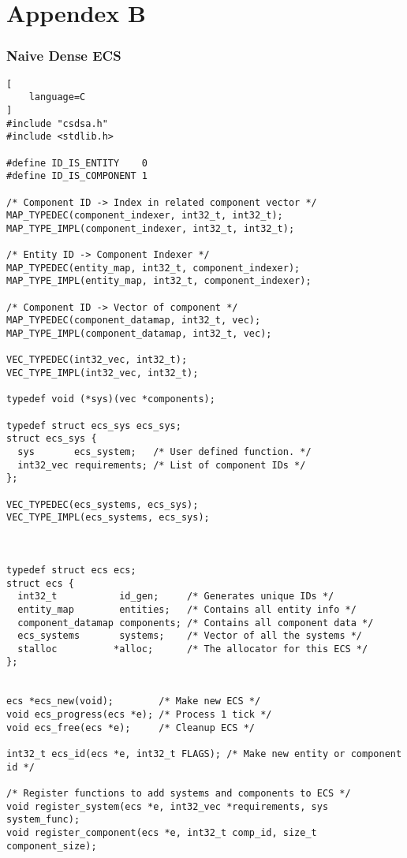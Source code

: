 \section{Appendex B}
\label{appendix:b}

\subsubsection{Naive Dense ECS}
\begin{lstlisting}[
    language=C
]
#include "csdsa.h"
#include <stdlib.h>

#define ID_IS_ENTITY    0
#define ID_IS_COMPONENT 1

/* Component ID -> Index in related component vector */
MAP_TYPEDEC(component_indexer, int32_t, int32_t);
MAP_TYPE_IMPL(component_indexer, int32_t, int32_t);

/* Entity ID -> Component Indexer */
MAP_TYPEDEC(entity_map, int32_t, component_indexer);
MAP_TYPE_IMPL(entity_map, int32_t, component_indexer);

/* Component ID -> Vector of component */
MAP_TYPEDEC(component_datamap, int32_t, vec);
MAP_TYPE_IMPL(component_datamap, int32_t, vec);

VEC_TYPEDEC(int32_vec, int32_t);
VEC_TYPE_IMPL(int32_vec, int32_t);

typedef void (*sys)(vec *components);

typedef struct ecs_sys ecs_sys;
struct ecs_sys {
  sys       ecs_system;   /* User defined function. */
  int32_vec requirements; /* List of component IDs */
};

VEC_TYPEDEC(ecs_systems, ecs_sys);
VEC_TYPE_IMPL(ecs_systems, ecs_sys);



typedef struct ecs ecs;
struct ecs {
  int32_t           id_gen;     /* Generates unique IDs */
  entity_map        entities;   /* Contains all entity info */
  component_datamap components; /* Contains all component data */
  ecs_systems       systems;    /* Vector of all the systems */
  stalloc          *alloc;      /* The allocator for this ECS */
};


ecs *ecs_new(void);        /* Make new ECS */
void ecs_progress(ecs *e); /* Process 1 tick */
void ecs_free(ecs *e);     /* Cleanup ECS */

int32_t ecs_id(ecs *e, int32_t FLAGS); /* Make new entity or component id */

/* Register functions to add systems and components to ECS */
void register_system(ecs *e, int32_vec *requirements, sys system_func);
void register_component(ecs *e, int32_t comp_id, size_t component_size);


\end{lstlisting}
